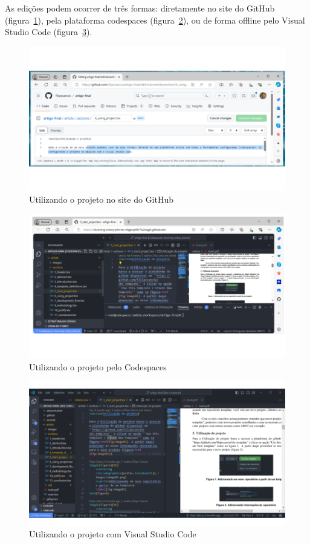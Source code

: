 As edições podem ocorrer de três formas: diretamente no site do GitHub (figura~\ref{fig:fig01}), pela plataforma codespaces (figura~\ref{fig:fig02}), ou de forma offline pelo Visual Studio Code (figura~\ref{fig:fig03}).


\begin{figure}[ht]
	\centering
	\includegraphics[width=.8\textwidth]{./images/fig03.png}
	\caption{Utilizando o projeto no site do GitHub}
	\label{fig:fig01}
\end{figure}

\begin{figure}[ht]
	\centering
	\includegraphics[width=.8\textwidth]{./images/fig02.png}
	\caption{Utilizando o projeto pelo Codespaces}
	\label{fig:fig02}
\end{figure}

\begin{figure}[ht]
	\centering
	\includegraphics[width=.8\textwidth]{./images/fig01.png}
	\caption{Utilizando o projeto com Visual Studio Code}
	\label{fig:fig03}
\end{figure}

\clearpage